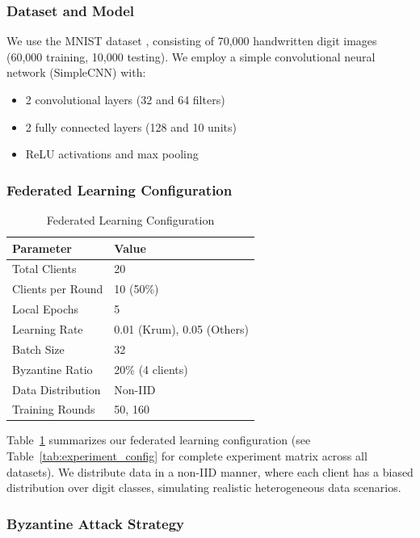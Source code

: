 \documentclass[12pt,a4paper,onecolumn]{article}
\begin{document}
\subsubsection{Dataset and Model}

We use the MNIST dataset \cite{lecun1998mnist}, consisting of 70,000 handwritten digit images (60,000 training, 10,000 testing). We employ a simple convolutional neural network (SimpleCNN) with:
\begin{itemize}
    \item 2 convolutional layers (32 and 64 filters)
    \item 2 fully connected layers (128 and 10 units)
    \item ReLU activations and max pooling
\end{itemize}

\subsubsection{Federated Learning Configuration}

\begin{table}[t]
\caption{Federated Learning Configuration}
\label{tab:fl_config}
\centering
\begin{tabular}{ll}
\toprule
\textbf{Parameter} & \textbf{Value} \\
\midrule
Total Clients & 20 \\
Clients per Round & 10 (50\%) \\
Local Epochs & 5 \\
Learning Rate & 0.01 (Krum), 0.05 (Others) \\
Batch Size & 32 \\
Byzantine Ratio & 20\% (4 clients) \\
Data Distribution & Non-IID \\
Training Rounds & 50, 160 \\
\bottomrule
\end{tabular}
\end{table}

Table~\ref{tab:fl_config} summarizes our federated learning configuration (see Table~\ref{tab:experiment_config} for complete experiment matrix across all datasets). We distribute data in a non-IID manner, where each client has a biased distribution over digit classes, simulating realistic heterogeneous data scenarios.

\subsubsection{Byzantine Attack Strategy}
\end{document}
